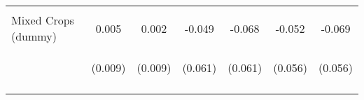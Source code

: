 \begin{center}
\begin{tabular}{lcccccc}
\vspace{4pt} & \begin{footnotesize}[0.068]\end{footnotesize} & \begin{footnotesize}[0.080]\end{footnotesize} & \begin{footnotesize}[0.123]\end{footnotesize} & \begin{footnotesize}[0.171]\end{footnotesize} & \begin{footnotesize}[0.122]\end{footnotesize} & \begin{footnotesize}[0.170]\end{footnotesize} \\
Mixed Crops (dummy) & 0.005 & 0.002 & -0.049 & -0.068 & -0.052 & -0.069 \\
 & \begin{footnotesize}(0.009)\end{footnotesize} & \begin{footnotesize}(0.009)\end{footnotesize} & \begin{footnotesize}(0.061)\end{footnotesize} & \begin{footnotesize}(0.061)\end{footnotesize} & \begin{footnotesize}(0.056)\end{footnotesize} & \begin{footnotesize}(0.056)\end{footnotesize} \\
\vspace{4pt} & \begin{footnotesize}[0.563]\end{footnotesize} & \begin{footnotesize}[0.837]\end{footnotesize} & \begin{footnotesize}[0.422]\end{footnotesize} & \begin{footnotesize}[0.268]\end{footnotesize} & \begin{footnotesize}[0.352]\end{footnotesize} & \begin{footnotesize}[0.219]\end{footnotesize} \\

\end{tabular}
\end{center}
